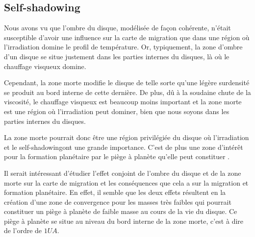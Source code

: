 \subsection{Self-shadowing}
Nous avons vu  que l'ombre du disque, modélisée de façon cohérente, n'était susceptible d'avoir une influence sur la carte de migration que dans une région où l'irradiation domine le profil de température. Or, typiquement, la zone d'ombre d'un disque se situe justement dans les parties internes du disques, là où le chauffage visqueux domine. 

Cependant, la zone morte modifie le disque de telle sorte qu'une légère surdensité se produit au bord interne de cette dernière. De plus, dû à la soudaine chute de la viscosité, le chauffage visqueux est beaucoup moins important et la zone morte est une région où l'irradiation peut dominer, bien que nous soyons dans les parties internes du disques. 

La zone morte pourrait donc être une région privilégiée du disque où l'irradiation et le \og self-shadowing\fg ont une grande importance. C'est de plus une zone d'intérêt pour la formation planétaire par le piège à planète qu'elle peut constituer \citep{hasegawa2011origin}.

Il serait intéressant d'étudier l'effet conjoint de l'ombre du disque et de la zone morte sur la carte de migration et les conséquences que cela a sur la migration et formation planétaire. En effet, il semble que les deux effets résultent en la création d'une zone de convergence pour les masses très faibles  qui pourrait constituer un piège à planète de faible masse au cours de la vie du disque. Ce piège à planète se situe au niveau du bord interne de la zone morte, c'est à dire de l'ordre de $1\unit{UA}$.
